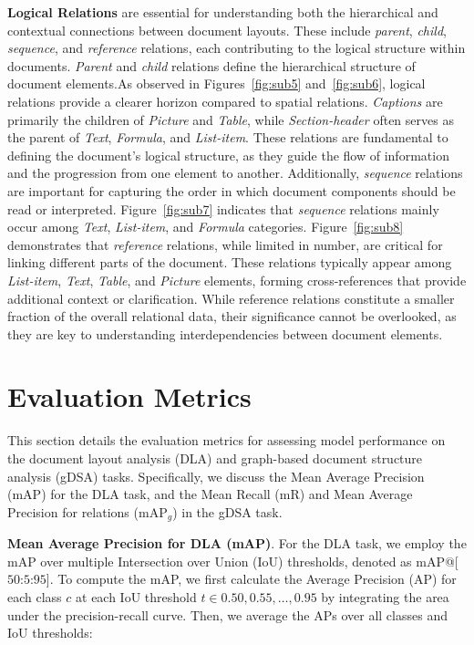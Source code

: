 \noindent \textbf{Logical Relations} are essential for understanding both the hierarchical and contextual connections between document layouts. These include \textit{parent}, \textit{child}, \textit{sequence}, and \textit{reference} relations, each contributing to the logical structure within documents. \textit{Parent} and \textit{child} relations define the hierarchical structure of document elements.As observed in Figures~\ref{fig:sub5} and~\ref{fig:sub6}, logical relations provide a clearer horizon compared to spatial relations. \textit{Captions} are primarily the children of \textit{Picture} and \textit{Table}, while \textit{Section-header} often serves as the parent of \textit{Text}, \textit{Formula}, and \textit{List-item}. These relations are fundamental to defining the document's logical structure, as they guide the flow of information and the progression from one element to another. Additionally, \textit{sequence} relations are important for capturing the order in which document components should be read or interpreted. Figure~\ref{fig:sub7} indicates that \textit{sequence} relations mainly occur among \textit{Text}, \textit{List-item}, and \textit{Formula} categories. Figure~\ref{fig:sub8} demonstrates that \textit{reference} relations, while limited in number, are critical for linking different parts of the document. These relations typically appear among \textit{List-item}, \textit{Text}, \textit{Table}, and \textit{Picture} elements, forming cross-references that provide additional context or clarification. While reference relations constitute a smaller fraction of the overall relational data, their significance cannot be overlooked, as they are key to understanding interdependencies between document elements.


\section{Evaluation Metrics}
\label{detail_eval}
This section details the evaluation metrics for assessing model performance on the document layout analysis (DLA) and graph-based document structure analysis (gDSA) tasks. Specifically, we discuss the Mean Average Precision (mAP) for the DLA task, and the Mean Recall (mR) and Mean Average Precision for relations (mAP$_g$) in the gDSA task.

\noindent \textbf{Mean Average Precision for DLA (mAP)}. For the DLA task, we employ the mAP over multiple Intersection over Union (IoU) thresholds, denoted as mAP@[$50$:$5$:$95$]. To compute the mAP, we first calculate the Average Precision (AP) for each class $c$ at each IoU threshold $t \in {0.50, 0.55, \dots, 0.95}$ by integrating the area under the precision-recall curve. Then, we average the APs over all classes and IoU thresholds:

